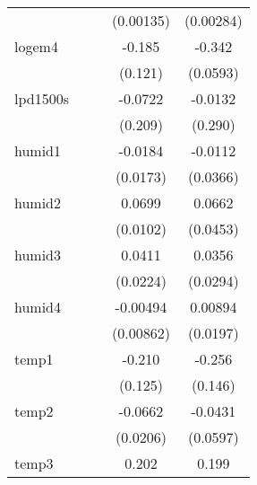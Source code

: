 {\begin{tabular}{l*{4}{c}}
            &                     &                     &   (0.00135)         &   (0.00284)         \\
[1em]
logem4      &                     &                     &      -0.185         &      -0.342\sym{***}\\
            &                     &                     &     (0.121)         &    (0.0593)         \\
[1em]
lpd1500s    &                     &                     &     -0.0722         &     -0.0132         \\
            &                     &                     &     (0.209)         &     (0.290)         \\
[1em]
humid1      &                     &                     &     -0.0184         &     -0.0112         \\
            &                     &                     &    (0.0173)         &    (0.0366)         \\
[1em]
humid2      &                     &                     &      0.0699\sym{***}&      0.0662         \\
            &                     &                     &    (0.0102)         &    (0.0453)         \\
[1em]
humid3      &                     &                     &      0.0411         &      0.0356         \\
            &                     &                     &    (0.0224)         &    (0.0294)         \\
[1em]
humid4      &                     &                     &    -0.00494         &     0.00894         \\
            &                     &                     &   (0.00862)         &    (0.0197)         \\
[1em]
temp1       &                     &                     &      -0.210         &      -0.256         \\
            &                     &                     &     (0.125)         &     (0.146)         \\
[1em]
temp2       &                     &                     &     -0.0662\sym{**} &     -0.0431         \\
            &                     &                     &    (0.0206)         &    (0.0597)         \\
[1em]
temp3       &                     &                     &       0.202\sym{***}&       0.199\sym{***}\\

\end{tabular}}
